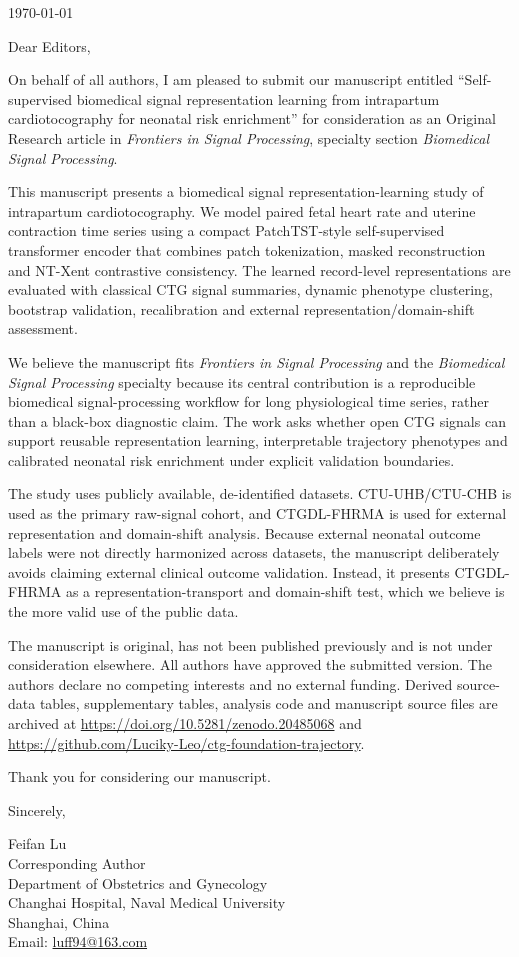 \documentclass[11pt]{article}
\begin{document}
\today

Dear Editors,

On behalf of all authors, I am pleased to submit our manuscript entitled ``Self-supervised biomedical signal representation learning from intrapartum cardiotocography for neonatal risk enrichment'' for consideration as an Original Research article in \textit{Frontiers in Signal Processing}, specialty section \textit{Biomedical Signal Processing}.

This manuscript presents a biomedical signal representation-learning study of intrapartum cardiotocography. We model paired fetal heart rate and uterine contraction time series using a compact PatchTST-style self-supervised transformer encoder that combines patch tokenization, masked reconstruction and NT-Xent contrastive consistency. The learned record-level representations are evaluated with classical CTG signal summaries, dynamic phenotype clustering, bootstrap validation, recalibration and external representation/domain-shift assessment.

We believe the manuscript fits \textit{Frontiers in Signal Processing} and the \textit{Biomedical Signal Processing} specialty because its central contribution is a reproducible biomedical signal-processing workflow for long physiological time series, rather than a black-box diagnostic claim. The work asks whether open CTG signals can support reusable representation learning, interpretable trajectory phenotypes and calibrated neonatal risk enrichment under explicit validation boundaries.

The study uses publicly available, de-identified datasets. CTU-UHB/CTU-CHB is used as the primary raw-signal cohort, and CTGDL-FHRMA is used for external representation and domain-shift analysis. Because external neonatal outcome labels were not directly harmonized across datasets, the manuscript deliberately avoids claiming external clinical outcome validation. Instead, it presents CTGDL-FHRMA as a representation-transport and domain-shift test, which we believe is the more valid use of the public data.

The manuscript is original, has not been published previously and is not under consideration elsewhere. All authors have approved the submitted version. The authors declare no competing interests and no external funding. Derived source-data tables, supplementary tables, analysis code and manuscript source files are archived at \url{https://doi.org/10.5281/zenodo.20485068} and \url{https://github.com/Luciky-Leo/ctg-foundation-trajectory}.

Thank you for considering our manuscript.

Sincerely,

Feifan Lu\\
Corresponding Author\\
Department of Obstetrics and Gynecology\\
Changhai Hospital, Naval Medical University\\
Shanghai, China\\
Email: \url{luff94@163.com}
\end{document}
